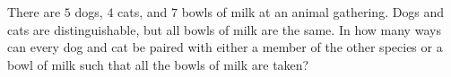 There are $ 5$ dogs, $ 4$ cats, and $ 7$ bowls of milk at an animal gathering. Dogs and cats are distinguishable, but all bowls of milk are the same. In how many ways can every dog and cat be paired with either a member of the other species or a bowl of milk such that all the bowls of milk are taken?